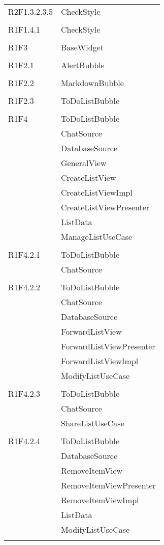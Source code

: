 \begin{center}
\begin{longtable}{|p{7cm}|p{7cm}|}
		R2F1.3.2.3.5 & CheckStyle \\ & \\ \hline
		R1F1.4.1 & CheckStyle \\ & \\ \hline
		R1F3 & BaseWidget \\ & \\ \hline
		R1F2.1 & AlertBubble \\ & \\ \hline
		R1F2.2 & MarkdownBubble \\ & \\ \hline
		R1F2.3 & ToDoListBubble \\ & \\ \hline
		R1F4 & ToDoListBubble \\ & ChatSource \\ & DatabaseSource \\ & GeneralView \\ & CreateListView \\ & CreateListViewImpl \\ & CreateListViewPresenter \\ & ListData \\ & ManageListUseCase \\ & \\ \hline
		R1F4.2.1 & ToDoListBubble \\ & ChatSource \\ & \\ \hline
		R1F4.2.2 & ToDoListBubble \\ & ChatSource \\ & DatabaseSource \\ & ForwardListView \\ & ForwardListViewPresenter \\ & ForwardListViewImpl \\ & ModifyListUseCase \\ & \\ \hline
		R1F4.2.3 & ToDoListBubble \\ & ChatSource \\ & ShareListUseCase \\ & \\ \hline
		R1F4.2.4 & ToDoListBubble \\ & DatabaseSource \\ & RemoveItemView \\ & RemoveItemViewPresenter \\ & RemoveItemViewImpl \\ & ListData \\ & ModifyListUseCase \\ & \\ \hline

\end{longtable}
\end{center}
